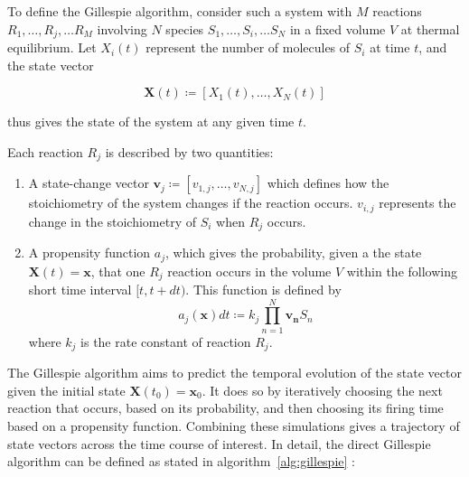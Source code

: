 To define the Gillespie algorithm, consider such a system with $M$ reactions $R_{1}, \ldots , R_{j}, \ldots R_{M}$ involving $N$ species $S_{1}, \ldots , S_{i}, \ldots S_{N}$ in a fixed volume $V$ at thermal equilibrium.
Let $X_{i}(t)$ represent the number of molecules of $S_{i}$ at time $t$, and the state vector

\begin{equation}
  \mathbf{X}(t) \coloneqq [X_{1}(t), \ldots , X_{N}(t)]
  \label{eq:gillespie-statevector}
\end{equation}

thus gives the state of the system at any given time $t$.

Each reaction $R_{j}$ is described by two quantities:
\begin{enumerate}
  \item A state-change vector $\mathbf{v}_{j} \coloneqq [v_{1,j}, \ldots , v_{N,j}]$ which defines how the stoichiometry of the system changes if the reaction occurs.
        $v_{i,j}$ represents the change in the stoichiometry of $S_{i}$ when $R_{j}$ occurs.
  \item A propensity function $a_{j}$, which gives the probability, given a the state $\mathbf{X}(t) = \mathbf{x}$, that one $R_{j}$ reaction occurs in the volume $V$ within the following short time interval $[t, t+dt)$.
        This function is defined by
        \begin{equation}
          a_{j}(\mathbf{x})dt \coloneqq k_{j} \prod_{n=1}^{N}\mathbf{v_{n}}S_{n}
          \label{eq:gillespie-propensity}
        \end{equation}
        where $k_{j}$ is the rate constant of reaction $R_{j}$.
\end{enumerate}

The Gillespie algorithm aims to predict the temporal evolution of the state vector given the initial state $\mathbf{X}(t_{0}) = \mathbf{x}_{0}$.
It does so by iteratively choosing the next reaction that occurs, based on its probability, and then choosing its firing time based on a propensity function.
Combining these simulations gives a trajectory of state vectors across the time course of interest.
In detail, the direct Gillespie algorithm can be defined as stated in algorithm~\ref{alg:gillespie} \parencite{gillespieStochasticSimulationChemical2007}:

